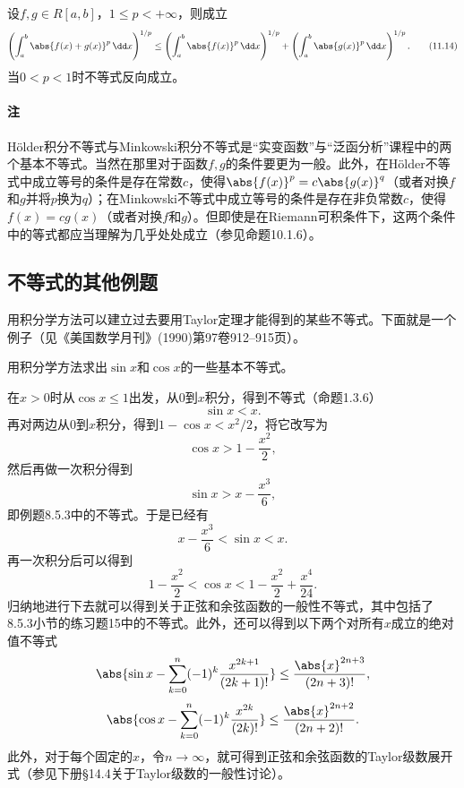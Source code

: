 \begin{xproposition}[11.2.5（Minkowski不等式）]
设$f,g\in R[a,b]$，$1\le p<+\infty$，则成立
\begin{equation}
  \left(\int_a^b\abs{f(x)+g(x)}^p\,\dd x\right)^{1/p}
  \le\left(\int_a^b\abs{f(x)}^p\,\dd x\right)^{1/p}
  +\left(\int_a^b\abs{g(x)}^p\,\dd x\right)^{1/p}.
  \tag{11.14}
  \label{eq:11.14}
\end{equation}
当$0<p<1$时不等式反向成立。
\end{xproposition}

\paragraph{注} Hölder积分不等式与Minkowski积分不等式是“实变函数”与“泛函分析”课程中的两个基本不等式。当然在那里对于函数$f,g$的条件要更为一般。此外，在Hölder不等式中成立等号的条件是存在常数$c$，使得$\abs{f(x)}^p=c\abs{g(x)}^q$（或者对换$f$和$g$并将$p$换为$q$）；在Minkowski不等式中成立等号的条件是存在非负常数$c$，使得$f(x)=cg(x)$（或者对换$f$和$g$）。但即使是在Riemann可积条件下，这两个条件中的等式都应当理解为几乎处处成立（参见命题10.1.6）。

\subsection{不等式的其他例题}

用积分学方法可以建立过去要用Taylor定理才能得到的某些不等式。下面就是一个例子（见《美国数学月刊》(1990)第97卷912--915页）。

\begin{xexample}[11.2.4]
用积分学方法求出$\sin x$和$\cos x$的一些基本不等式。
\end{xexample}
\begin{xsolution}
在$x>0$时从$\cos x\le1$出发，从0到$x$积分，得到不等式（命题1.3.6）
\[
  \sin x<x.
\]
再对两边从0到$x$积分，得到$1-\cos x<x^2/2$，将它改写为
\[
  \cos x>1-\frac{x^2}{2},
\]
然后再做一次积分得到
\[
  \sin x>x-\frac{x^3}{6},
\]
即例题8.5.3中的不等式。于是已经有
\[
  x-\frac{x^3}{6}<\sin x<x.
\]
再一次积分后可以得到
\[
  1-\frac{x^2}{2}<\cos x<1-\frac{x^2}{2}+\frac{x^4}{24}.
\]
归纳地进行下去就可以得到关于正弦和余弦函数的一般性不等式，其中包括了8.5.3小节的练习题15中的不等式。此外，还可以得到以下两个对所有$x$成立的绝对值不等式
\[
  \abs{\sin x-\sum_{k=0}^n(-1)^k\frac{x^{2k+1}}{(2k+1)!}}
  \le\frac{\abs{x}^{2n+3}}{(2n+3)!},
\]
\[
  \abs{\cos x-\sum_{k=0}^n(-1)^k\frac{x^{2k}}{(2k)!}}
  \le\frac{\abs{x}^{2n+2}}{(2n+2)!}.
\]
此外，对于每个固定的$x$，令$n\to\infty$，就可得到正弦和余弦函数的Taylor级数展开式（参见下册§14.4关于Taylor级数的一般性讨论）。
\end{xsolution}

